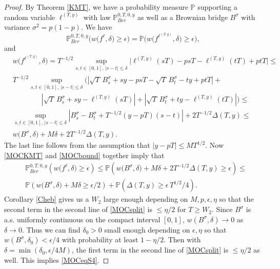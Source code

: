 \begin{proof}
	By Theorem \ref{KMT}, we have a probability measure $\mathbb{P}$ supporting a random variable $\ell^{(T,y)}$ with law $\mathbb{P}^{0,T,0,y}_{Ber}$ as well as a Brownian bridge $B^\sigma$ with variance $\sigma^2 = p(1-p)$. We have
	\begin{equation}\label{MOCKMT}
	\mathbb{P}^{0,T,0,y}_{Ber}\Big( w\big({f^\ell},\delta\big) \geq \epsilon \Big) = \mathbb{P}\Big( w\big(f^{\ell^{(T,y)}},\delta\big) \geq \epsilon \Big),
	\end{equation}
	and
	\begin{equation}\label{MOCbound}
	\begin{split}
	& w\big(f^{\ell^{(T,y)}},\delta\big) = T^{-1/2} \sup_{s,t\in[0,1],\, |s-t|\leq\delta} \Big| \ell^{(T,y)}(sT) - psT - \ell^{(T,y)}(tT) + ptT \Big| \leq\\
	&T^{-1/2} \sup_{s,t \in [0,1], \, |s-t| \leq \delta} \bigg(\left| \sqrt{T}\,B^\sigma_s + sy - psT - \sqrt{T}\,B^\sigma_t - ty + ptT \right| +\\
	&\qquad \qquad \left|\sqrt{T}\,B^\sigma_s + sy - \ell^{(T,y)}(sT)\right| + \left|\sqrt{T}\,B^\sigma_t + ty - \ell^{(T,y)}(tT)\right|\bigg) \leq\\
	& \sup_{s,t \in [0,1], \, |s-t| \leq \delta} \left| B^\sigma_s - B^\sigma_t + T^{-1/2} (y-pT)(s-t)\right| + 2T^{-1/2}\Delta(T,y) \leq\\
	& w\big(B^\sigma,\delta\big) + M\delta + 2T^{-1/2}\Delta(T,y).
	\end{split}
	\end{equation}
	The last line follows from the assumption that $|y-pT|\leq MT^{1/2}$. Now \eqref{MOCKMT} and \eqref{MOCbound} together imply that
	\begin{equation}\label{MOCsplit}
	\begin{split}
	&\mathbb{P}^{0,T,0,y}_{Ber}\left( w\big(f^{\ell},\delta\big) \geq \epsilon \right) \leq \mathbb{P}\left( w\big(B^\sigma,\delta\big) + M\delta + 2T^{-1/2}\Delta(T,y) \geq \epsilon \right) \leq\\
	&\mathbb{P}\left( w\big(B^\sigma,\delta\big) + M\delta \geq \epsilon/2 \right) + \mathbb{P}\left( \Delta(T,y) \geq \epsilon\, T^{1/2}/4 \right).
	\end{split}
	\end{equation}
	Corollary \ref{Cheb} gives us a $W_2$ large enough depending on $M,p,\epsilon,\eta$ so that the second term in the second line of \ref{MOCsplit} is $\leq\eta/2$ for $T\geq W_2$. Since $B^\sigma$ is a.s. uniformly continuous on the compact interval $[0,1]$, $w(B^\sigma,\delta) \to 0$ as $\delta\to 0$. Thus we can find $\delta_0>0$ small enough depending on $\epsilon,\eta$ so that $w(B^\sigma,\delta_0) < \epsilon/4$ with probability at least $1-\eta/2$. Then with $\delta = \min(\delta_0, \epsilon/4M)$, the first term in the second line of \eqref{MOCsplit} is $\leq\eta/2$ as well. This implies \eqref{MOCeqS4}.
\end{proof}

